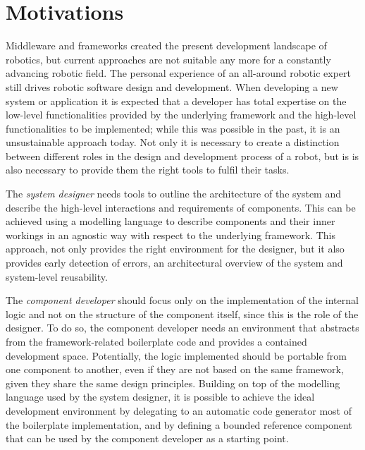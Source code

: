 \section{Motivations}
Middleware and frameworks created the present development landscape of robotics, but current approaches are not suitable any more for a constantly advancing robotic field. The personal experience of an all-around robotic expert still drives robotic software design and development. When developing a new system or application it is expected that a developer has total expertise on the low-level functionalities provided by the underlying framework and the high-level functionalities to be implemented; while this was possible in the past, it is an unsustainable approach today. Not only it is necessary to create a distinction between different roles in the design and development process of a robot, but is is also necessary to provide them the right tools to fulfil  their tasks.

The \textit{system designer} needs tools to outline the architecture of the system and describe the high-level interactions and requirements of components. This can be achieved using a modelling language to describe components and their inner workings in an agnostic way with respect to the underlying framework. This approach, not only provides the right environment for the designer, but it also provides early detection of errors, an architectural overview of the system and system-level reusability. 

The \textit{component developer} should focus only on the implementation of the internal logic and not on the structure of the component itself, since this is the role of the designer. To do so, the component developer needs an environment that abstracts from the framework-related boilerplate code and provides a contained development space. Potentially, the logic implemented should be portable from one component to another, even if they are not based on the same framework, given they share the same design principles. Building on top of the modelling language used by the system designer, it is possible to achieve the ideal development environment by delegating to an automatic code generator most of the boilerplate implementation, and by defining a bounded reference component that can be used by the component developer as a starting point.

